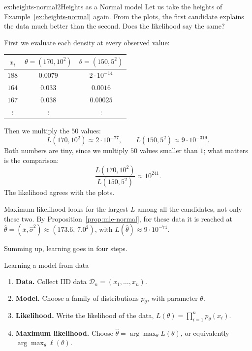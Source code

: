 \documentclass[a4paper,12pt,oneside]{report}
\begin{document}
\begin{framedexamplepart}{ex:heights-normal}{2}{Heights as a Normal model}\label{ex:heights-likelihood}
Let us take the heights of Example~\ref{ex:heights-normal} again. From the
plots, the first candidate explains the data much better than the second. Does the likelihood say the same?

First we evaluate each density at every observed value:
\begin{center}
\begin{tabular}{c|cc}
$x_i$ & $\theta=(170,10^2)$ & $\theta=(150,5^2)$\\
\hline
$188$ & $0.0079$ & $2\cdot10^{-14}$\\
$164$ & $0.033$ & $0.0016$\\
$167$ & $0.038$ & $0.00025$\\
$\vdots$ & $\vdots$ & $\vdots$
\end{tabular}
\end{center}

Then we multiply the $50$ values:
\[
L(170,10^2)\approx2\cdot10^{-77},\qquad L(150,5^2)\approx9\cdot10^{-319}.
\]
Both numbers are tiny, since we multiply $50$ values smaller than $1$; what
matters is the comparison:
\[
\frac{L(170,10^2)}{L(150,5^2)}\approx10^{241}.
\]
The likelihood agrees with the plots.

Maximum likelihood looks for the
largest $L$ among all the candidates, not only these two. By
Proposition~\ref{prop:mle-normal}, for these data it is reached at
$\hat\theta=(\bar x,\hat\sigma^2)\approx(173.6,\,7.0^2)$, with
$L(\hat\theta)\approx9\cdot10^{-74}$.
\end{framedexamplepart}

Summing up, learning goes in four steps.

\begin{framedalgo}{Learning a model from data}\label{alg:learning}
\begin{enumerate}
\item \textbf{Data.} Collect IID data $\mathcal{D}_n=(x_1,\ldots,x_n)$.
\item \textbf{Model.} Choose a family of distributions $p_\theta$, with
parameter $\theta$.
\item \textbf{Likelihood.} Write the likelihood of the data,
$L(\theta)=\prod_{i=1}^n p_\theta(x_i)$.
\item \textbf{Maximum likelihood.} Choose
$\hat\theta=\arg\max_{\theta}L(\theta)$, or equivalently
$\arg\max_{\theta}\ell(\theta)$.
\end{enumerate}
\end{framedalgo}
\end{document}
